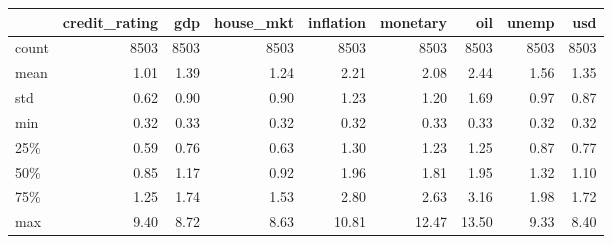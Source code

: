 \begin{tabular}{lrrrrrrrr}
  \toprule
  {} &  credit\_rating &    gdp &  house\_mkt &  inflation &  monetary &   oil &  unemp &   usd \\
  \midrule
  count &        8503 & 8503 &    8503 &    8503 &   8503 & 8503 & 8503 & 8503 \\
  mean  &           1.01 &    1.39 &       1.24 &       2.21 &      2.08 &    2.44 &    1.56 &    1.35 \\
  std   &           0.62 &    0.90 &       0.90 &       1.23 &      1.20 &    1.69 &    0.97 &    0.87 \\
  min   &           0.32 &    0.33 &       0.32 &       0.32 &      0.33 &    0.33 &    0.32 &    0.32 \\
  25\%   &           0.59 &    0.76 &       0.63 &       1.30 &      1.23 &    1.25 &    0.87 &    0.77 \\
  50\%   &           0.85 &    1.17 &       0.92 &       1.96 &      1.81 &    1.95 &    1.32 &    1.10 \\
  75\%   &           1.25 &    1.74 &       1.53 &       2.80 &      2.63 &    3.16 &    1.98 &    1.72 \\
  max   &           9.40 &    8.72 &       8.63 &      10.81 &     12.47 &   13.50 &    9.33 &    8.40 \\
  \bottomrule
  \end{tabular}